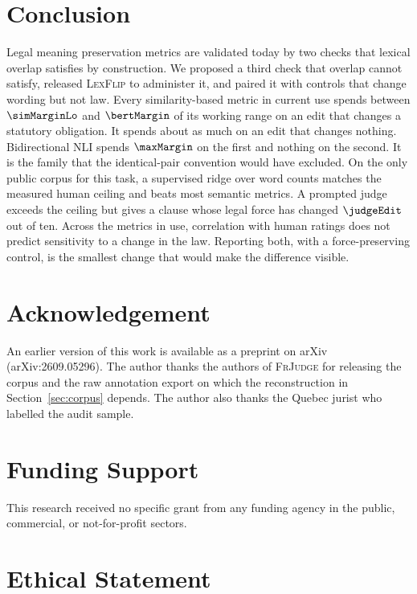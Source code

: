 \documentclass{BVP_JCLLT}
\newcommand{\rev}[1]{#1}
\newcommand{\rev}[1]{{\color{revcol}#1}}
\begin{document}
\section{Conclusion}\label{sec:conclusion}

\rev{Legal meaning preservation metrics are validated today by two checks that
lexical overlap satisfies by construction. We proposed a third check that overlap
cannot satisfy, released \textsc{LexFlip} to administer it, and paired it with
controls that change wording but not law. Every similarity-based metric in
current use spends between $\simMarginLo$ and $\bertMargin$ of its working range
on an edit that changes a statutory obligation. It spends about as much on an
edit that changes nothing. Bidirectional NLI spends $\maxMargin$ on the first and
nothing on the second. It is the family that the identical-pair convention
would have excluded. On the only public corpus for this task, a supervised ridge
over word counts matches the measured human ceiling and beats most semantic
metrics. A prompted judge exceeds the ceiling but gives a clause whose legal
force has changed $\judgeEdit$ out of ten. Across the metrics in use,
correlation with human ratings does not predict sensitivity to a change in the
law. Reporting both, with a force-preserving control, is the smallest change
that would make the difference visible.}

\section*{Acknowledgement}\label{acknowledgement}

\rev{An earlier version of this work is available as a preprint on arXiv
(arXiv:2609.05296).} The author thanks the authors of \textsc{FrJudge} for
releasing the corpus and the raw annotation export on which the reconstruction
in Section~\ref{sec:corpus} depends. \rev{The author also thanks the Quebec
jurist who labelled the audit sample.}

\section*{Funding Support}\label{funding-support}

This research received no specific grant from any funding agency in the public,
commercial, or not-for-profit sectors.

\section*{Ethical Statement}\label{ethical-statement}
\end{document}
